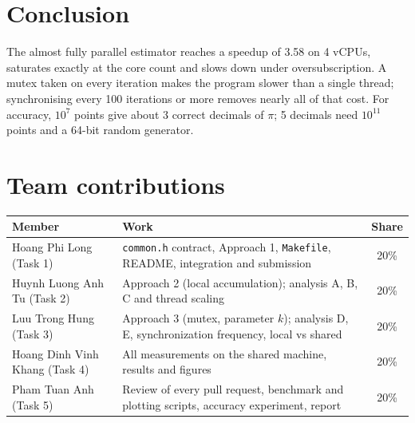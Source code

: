 \documentclass[11pt,a4paper]{article}
\newcommand{\code}[1]{\texttt{#1}}
\begin{document}
\section{Conclusion}
The almost fully parallel estimator reaches a speedup of 3.58 on 4 vCPUs, saturates exactly at the core count and slows down under oversubscription. A mutex taken on every iteration makes the program slower than a single thread; synchronising every 100 iterations or more removes nearly all of that cost. For accuracy, $10^7$ points give about 3 correct decimals of $\pi$; 5 decimals need $10^{11}$ points and a 64-bit random generator.

\section{Team contributions}
\begin{table}[H]
\centering
\begin{tabularx}{\textwidth}{|l|X|c|}
\hline
\textbf{Member} & \textbf{Work} & \textbf{Share} \\ \hline
Hoang Phi Long (Task 1) & \code{common.h} contract, Approach 1, \code{Makefile}, README, integration and submission & 20\% \\ \hline
Huynh Luong Anh Tu (Task 2) & Approach 2 (local accumulation); analysis A, B, C and thread scaling & 20\% \\ \hline
Luu Trong Hung (Task 3) & Approach 3 (mutex, parameter $k$); analysis D, E, synchronization frequency, local vs shared & 20\% \\ \hline
Hoang Dinh Vinh Khang (Task 4) & All measurements on the shared machine, results and figures & 20\% \\ \hline
Pham Tuan Anh (Task 5) & Review of every pull request, benchmark and plotting scripts, accuracy experiment, report & 20\% \\ \hline
\end{tabularx}
\end{table}
\end{document}
